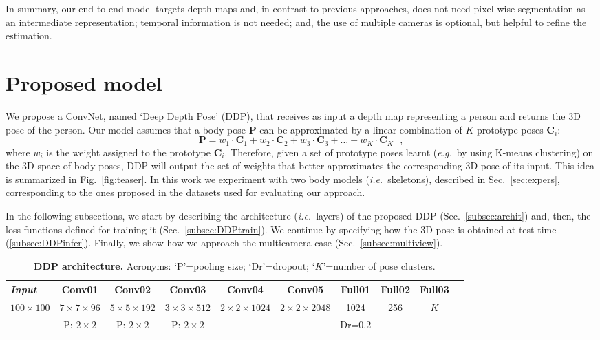 \documentclass[review,12pt,3p]{elsarticle}
\def \eg{\textit{e.g.}}
\def \ie{\textit{i.e.}}
\begin{document}
In summary, our end-to-end model targets depth maps and, in contrast to previous approaches, does not need pixel-wise segmentation as an intermediate representation; temporal information is not needed; and, the use of multiple cameras is optional, but helpful to refine the estimation. 

\section{Proposed model} \label{sec:model}
We propose a ConvNet, named `Deep Depth Pose' (DDP), that receives as input a depth map representing a person and returns the 3D pose of the person. 
Our model assumes that a body pose  $\mathbf{P}$ can be approximated by a linear combination of $K$ prototype poses $\mathbf{C}_i$:
\begin{equation}\label{eq:poselcombTeaser}
    \mathbf{P} = w_1 \cdot \mathbf{C}_1 + w_2 \cdot \mathbf{C}_2 + w_3 \cdot \mathbf{C}_3 + \ldots + w_K \cdot \mathbf{C}_K   \textrm{ },
\end{equation}
where $w_i$ is the weight assigned to the prototype $\mathbf{C}_i$.
Therefore, given a set of prototype poses learnt (\eg~by using K-means clustering) on the 3D space of body poses, DDP will output the set of weights that better approximates the corresponding 3D pose of its input. This idea is summarized in Fig.~\ref{fig:teaser}.
In this work we experiment with two body models (\ie~skeletons), described in Sec.~\ref{sec:expers}, corresponding to the ones proposed in the datasets used for evaluating our approach. 

In the following subsections, we start by  describing the architecture (\ie~layers) of the proposed DDP (Sec.~\ref{subsec:archit}) and, then, the loss functions defined for training it (Sec.~\ref{subsec:DDPtrain}). We continue by specifying how the 3D pose is obtained at test time (\ref{subsec:DDPinfer}). Finally, we show how we approach the multicamera case (Sec.~\ref{subsec:multiview}).

\begin{table}[t]
\caption{\textbf{DDP architecture.} Acronyms: `P'=pooling size; `Dr'=dropout; `$K$'=number of pose clusters. }
\label{tab:cnnarch}
\footnotesize
\begin{center}
\setlength{\tabcolsep}{0.2em} %
\begin{tabular}{|l|c|c|c|c|c|c|c|c|c|}
\hline 
\textit{Input} & Conv01 & Conv02 & Conv03 & Conv04 & Conv05 &Full01 & Full02 & Full03\\ 
\hline \hline
$100 \times 100$ & $7 \times 7  \times 96$ & $5 \times 5 \times 192$ & $3 \times 3 \times 512$ & $2 \times 2 \times 1024$ & $2 \times 2 \times 2048$ & 1024 & 256 & $K$\\
 & P: $2\times 2$ & P: $2\times 2$ & P: $2\times 2$ &  & & Dr=0.2  & & \\
\hline 
\end{tabular} 
\end{center}
\end{table}
\end{document}
